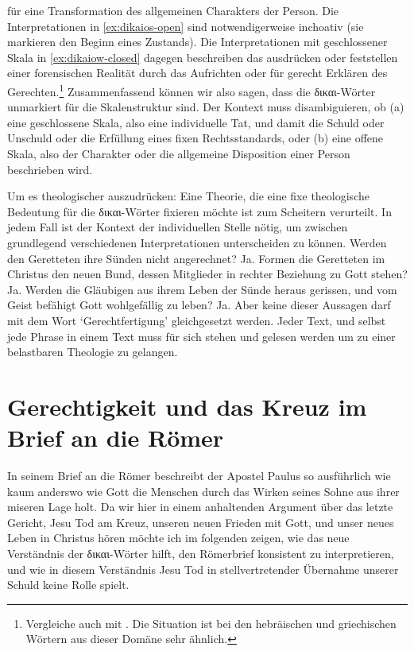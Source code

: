 für eine Transformation des allgemeinen Charakters der Person.
Die Interpretationen in \ref{ex:dikaios-open} sind notwendigerweise inchoativ (sie markieren den Beginn eines Zustands).
Die Interpretationen mit geschlossener Skala in \ref{ex:dikaiow-closed} dagegen beschreiben das ausdrücken oder feststellen einer
forensischen Realität durch das Aufrichten oder für gerecht Erklären des Gerechten.\footnote{
	Vergleiche auch mit \Cite{hebrew-verbs-of-judgement}.
	Die Situation ist bei den hebräischen und griechischen Wörtern aus dieser Domäne sehr ähnlich.
}
Zusammenfassend können wir also sagen, dass die δικαι-Wörter unmarkiert für die Skalenstruktur sind.
Der Kontext muss disambiguieren, ob
(a) eine geschlossene Skala, also eine individuelle Tat, und damit die Schuld oder Unschuld oder die Erfüllung eines fixen Rechtsstandards, oder
(b) eine offene Skala, also der Charakter oder die allgemeine Disposition einer Person beschrieben wird.

Um es theologischer auszudrücken:
Eine Theorie, die eine fixe theologische Bedeutung für die δικαι-Wörter fixieren möchte ist zum Scheitern verurteilt.
In jedem Fall ist der Kontext der individuellen Stelle nötig, um zwischen grundlegend verschiedenen Interpretationen unterscheiden zu können.
Werden den Geretteten ihre Sünden nicht angerechnet? Ja.
Formen die Geretteten im Christus den neuen Bund, dessen Mitglieder in rechter Beziehung zu Gott stehen? Ja.
Werden die Gläubigen aus ihrem Leben der Sünde heraus gerissen, und vom Geist befähigt Gott wohlgefällig zu leben? Ja.
Aber keine dieser Aussagen darf mit dem Wort `Gerechtfertigung' gleichgesetzt werden. Jeder Text, und selbst jede Phrase in einem Text muss für sich stehen und gelesen werden
um zu einer belastbaren Theologie zu gelangen.

\section{Gerechtigkeit und das Kreuz im Brief an die Römer}
In seinem Brief an die Römer beschreibt der Apostel Paulus so ausführlich wie kaum anderswo wie Gott die Menschen
durch das Wirken seines Sohne aus ihrer miseren Lage holt.
Da wir hier in einem anhaltenden Argument über das letzte Gericht, Jesu Tod am Kreuz, unseren neuen Frieden mit Gott, und unser neues Leben in Christus hören
möchte ich im folgenden zeigen, wie das neue Verständnis der δικαι-Wörter hilft, den Römerbrief konsistent zu interpretieren,
und wie in diesem Verständnis Jesu Tod in stellvertretender Übernahme unserer Schuld keine Rolle spielt.

